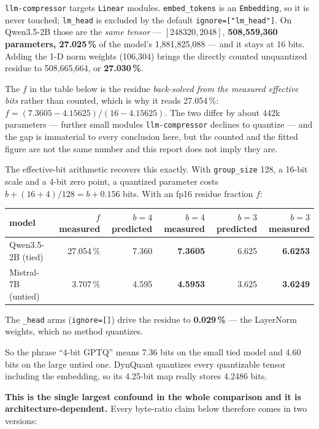 \documentclass[11pt]{article}
\newcommand{\pct}{\,\%}
\newcommand{\code}[1]{\texttt{#1}}
\newcommand{\best}[1]{\textbf{#1}}
\begin{document}
\code{llm-compressor} targets \code{Linear} modules. \code{embed\_tokens} is an \code{Embedding},
so it is never touched; \code{lm\_head} is excluded by the default \code{ignore=["lm\_head"]}. On
Qwen3.5-2B those are the \emph{same tensor} --- $[248320, 2048]$, \textbf{508{,}559{,}360
parameters, 27.025\pct} of the model's 1{,}881{,}825{,}088 --- and it stays at 16 bits. Adding
the 1-D norm weights (106{,}304) brings the directly counted unquantized residue to
508{,}665{,}664, or \textbf{27.030\pct}.

The $f$ in the table below is the residue \emph{back-solved from the measured effective bits}
rather than counted, which is why it reads 27.054\pct:
$f = (7.3605 - 4.15625) / (16 - 4.15625)$. The two differ by about 442k parameters --- further
small modules \code{llm-compressor} declines to quantize --- and the gap is immaterial to every
conclusion here, but the counted and the fitted figure are not the same number and this report
does not imply they are.

The effective-bit arithmetic recovers this exactly. With \code{group\_size} 128, a 16-bit scale
and a 4-bit zero point, a quantized parameter costs $b + (16+4)/128 = b + 0.156$ bits. With an
fp16 residue fraction $f$:

\begin{center}\small
\begin{tabular}{@{}lrrrrr@{}}
\toprule
model & $f$ measured & $b{=}4$ predicted & $b{=}4$ measured & $b{=}3$ predicted & $b{=}3$ measured \\
\midrule
Qwen3.5-2B (tied) & 27.054\pct & 7.360 & \best{7.3605} & 6.625 & \best{6.6253} \\
Mistral-7B (untied) & 3.707\pct & 4.595 & \best{4.5953} & 3.625 & \best{3.6249} \\
\bottomrule
\end{tabular}
\end{center}

The \code{\_head} arms (\code{ignore=[]}) drive the residue to \textbf{0.029\pct} --- the
LayerNorm weights, which no method quantizes.

So the phrase ``4-bit GPTQ'' means 7.36 bits on the small tied model and 4.60 bits on the large
untied one. DynQuant quantizes every quantizable tensor including the embedding, so its 4.25-bit
map really stores 4.2486 bits.

\textbf{This is the single largest confound in the whole comparison and it is
architecture-dependent.} Every byte-ratio claim below therefore comes in two versions:
\end{document}
